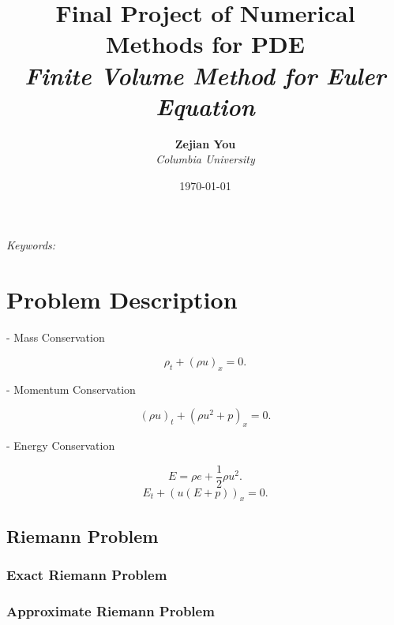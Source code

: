 \documentclass[11pt]{diazessay} %
\title{\textbf{Final Project of Numerical Methods for PDE} \\ {\Large\itshape Finite Volume Method for Euler Equation}} %
\author{\textbf{Zejian You} \\ \textit{Columbia University}} %
\date{\today} %
\begin{document}
\maketitle %



\begin{abstract}

\end{abstract}

\hspace*{3.6mm}\textit{Keywords:}  %

\vspace{30pt} %

\section{Problem Description}

- Mass Conservation
  
$$\rho_t + (\rho u)_x = 0.$$

- Momentum Conservation

$$(\rho u)_t + (\rho u^2 + p)_x = 0.$$

- Energy Conservation
  
$$E = \rho e + \frac{1}{2}\rho u^2.$$
$$E_t + (u(E+p))_x = 0.$$

\subsection{Riemann Problem}
\subsubsection{Exact Riemann Problem}
\subsubsection{Approximate Riemann Problem}
\end{document}
